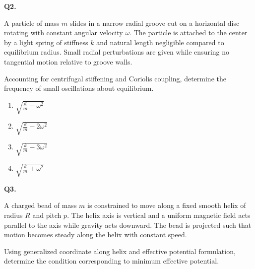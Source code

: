 \documentclass[12pt]{article}
\begin{document}

\textbf{Q2.}

A particle of mass $m$ slides in a narrow radial groove cut on a horizontal disc rotating with constant angular velocity $\omega$. The particle is attached to the center by a light spring of stiffness $k$ and natural length negligible compared to equilibrium radius. Small radial perturbations are given while ensuring no tangential motion relative to groove walls.

Accounting for centrifugal stiffening and Coriolis coupling, determine the frequency of small oscillations about equilibrium.

\begin{enumerate}
\item[(A)] $\sqrt{\frac{k}{m}-\omega^2}$
\item[(B)] $\sqrt{\frac{k}{m}-2\omega^2}$
\item[(C)] $\sqrt{\frac{k}{m}-3\omega^2}$
\item[(D)] $\sqrt{\frac{k}{m}+\omega^2}$
\end{enumerate}


\textbf{Q3.}

A charged bead of mass $m$ is constrained to move along a fixed smooth helix of radius $R$ and pitch $p$. The helix axis is vertical and a uniform magnetic field acts parallel to the axis while gravity acts downward. The bead is projected such that motion becomes steady along the helix with constant speed.

Using generalized coordinate along helix and effective potential formulation, determine the condition corresponding to minimum effective potential.

\begin{center}
\end{center}
\end{document}
